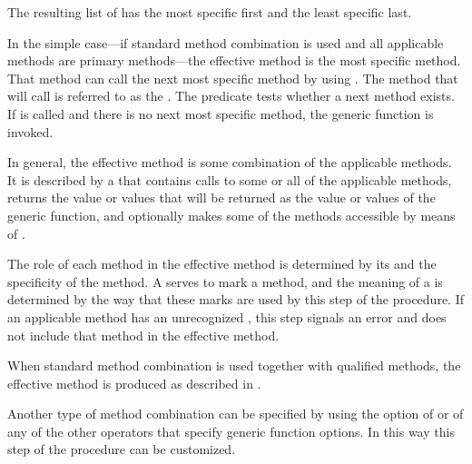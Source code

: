 The resulting list of  has the most specific
 first and the least specific  last.    

\endsubsubsubsection%


In the simple case---if standard method combination is used and all
applicable methods are primary methods---the 
effective method is the most specific method.
That method can call the next most specific
method by using .  The method that
 will call is referred to as the 
.  The predicate  tests whether a next
method exists.  If  is called and there is no
next most specific method, the generic function 
is invoked.

In general, the effective method is some combination of the applicable
methods.  It is described by a  that contains calls to some or
all of the applicable methods, returns the value or values that will
be returned as the value or values of the generic function, and
optionally makes some of the methods accessible by means of 
.

The role of each method in the effective method is determined by its
 and the specificity of the method.  A 
serves to mark a method, and the meaning of a  is
determined by the way that these marks are used by this step
of the procedure.  If an applicable method has an unrecognized
, this step signals an error and does not include that method
in the effective method.

When standard method combination is used together with qualified methods, 
the effective method is produced as described in \secref\StdMethComb.
                                                                  
Another type of method combination can be specified by using the
 option of  or
of any of the other operators that specify generic function options.  In
this way this step of the procedure can be customized.

